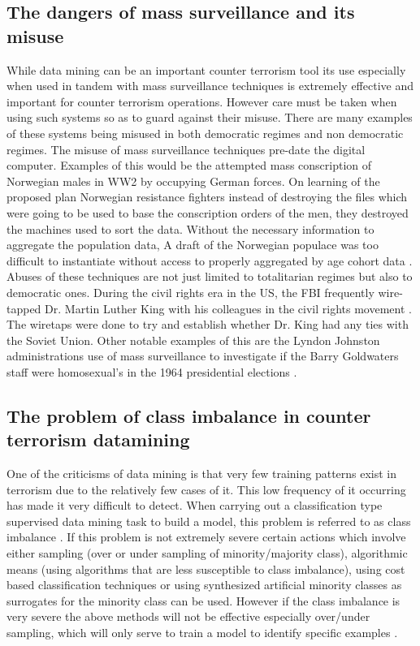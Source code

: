 \subsection{The dangers of mass surveillance and its misuse}
While data mining can be an important counter terrorism tool its use especially when used in tandem with mass surveillance techniques is extremely effective and important for counter terrorism operations. However care must be taken when using such systems so as to guard against their misuse. There are many examples of these systems being misused in both democratic regimes and non democratic regimes. The misuse of mass surveillance techniques pre-date the digital computer. Examples of this would  be the attempted mass conscription of Norwegian males in WW2 by occupying German forces. On learning of the proposed plan Norwegian resistance fighters instead of destroying the files which were going to be used to base the conscription orders of the men, they destroyed the machines used to sort the data. Without the necessary information to aggregate the population data, A draft of the Norwegian populace was too difficult to instantiate without access to properly aggregated by age cohort data \citep{bignami2007european}. Abuses of these techniques are not just limited to totalitarian regimes but also to democratic ones. During the civil rights era in the US, the FBI frequently wire-tapped Dr. Martin Luther King with his colleagues in the civil rights movement \citep{garrow2015fbi}. The wiretaps were done to try and establish whether Dr. King had any ties with the Soviet Union. Other notable examples of this are the Lyndon Johnston administrations use of mass surveillance to investigate if the Barry Goldwaters staff were homosexual's in the 1964 presidential elections \citep{sales2014domesticating}.

\subsection{The problem of class imbalance in counter terrorism datamining} 
One of the criticisms of data mining is that very few training patterns exist in terrorism due to the relatively few cases of it. This low frequency of it occurring has made it very difficult to detect. When carrying out a classification type supervised data mining task to build a model, this problem is referred to as class imbalance \citep{SASClassimbalance2015}. If this problem is not extremely severe certain actions which involve either sampling (over or under sampling of minority/majority class), algorithmic means (using algorithms that are less susceptible to class imbalance), using cost based classification techniques or using synthesized artificial minority classes as surrogates for the minority class can be used. However if the class imbalance is very severe the above methods will not be effective especially over/under sampling, which will only serve to train a model to identify specific examples \citep{jonas2006effective}.

